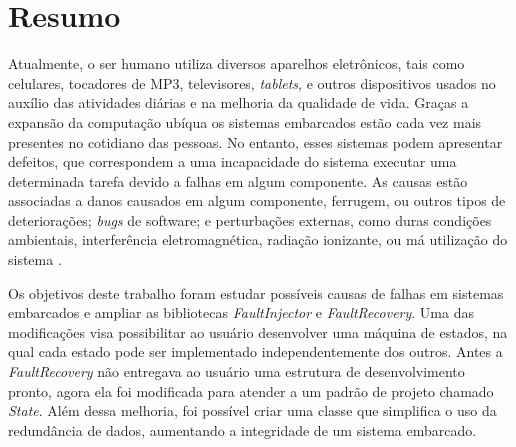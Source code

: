 
\chapter*{Resumo}

{\setlength{\parindent}{0cm}
	
Atualmente, o ser humano utiliza diversos aparelhos eletrônicos, tais como celulares, tocadores de MP3, televisores, \textit{tablets}, e outros dispositivos usados no auxílio das atividades diárias e na melhoria da qualidade de vida. Graças a expansão da computação ubíqua os sistemas embarcados estão cada vez mais presentes no cotidiano das pessoas. No entanto, esses sistemas podem apresentar defeitos, que correspondem a uma incapacidade do sistema executar uma determinada tarefa devido a falhas em algum componente. As causas estão associadas a danos causados em algum componente, ferrugem, ou outros tipos de deteriorações; \textit{bugs} de software; e perturbações externas, como duras condições ambientais, interferência eletromagnética, radiação ionizante, ou má utilização do sistema \cite{Nelson:1990}.

Os objetivos deste trabalho foram estudar possíveis causas de falhas em sistemas embarcados e ampliar as bibliotecas \textit{FaultInjector} e \textit{FaultRecovery}. Uma das modificações visa possibilitar ao usuário desenvolver uma máquina de estados, na qual cada estado pode ser implementado independentemente dos outros. Antes a \textit{FaultRecovery} não entregava ao usuário uma estrutura de desenvolvimento pronto, agora ela foi modificada para atender a um padrão de projeto chamado \textit{State}. Além dessa melhoria, foi possível criar uma classe que simplifica o uso da redundância de dados, aumentando a integridade de um sistema embarcado.

}
